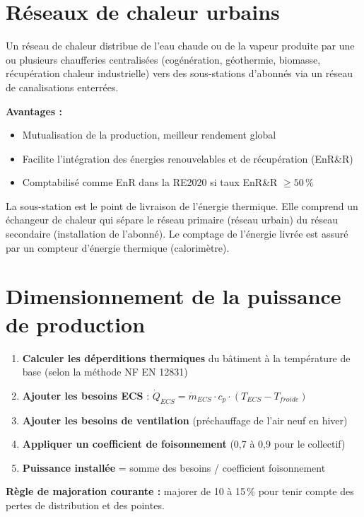 \section{Réseaux de chaleur urbains}

\begin{definition}[title=Réseau de chaleur urbain]
Un réseau de chaleur distribue de l'eau chaude ou de la vapeur produite par une ou plusieurs chaufferies centralisées (cogénération, géothermie, biomasse, récupération chaleur industrielle) vers des sous-stations d'abonnés via un réseau de canalisations enterrées.

\textbf{Avantages :}
\begin{itemize}
  \item Mutualisation de la production, meilleur rendement global
  \item Facilite l'intégration des énergies renouvelables et de récupération (EnR\&R)
  \item Comptabilisé comme EnR dans la RE2020 si taux EnR\&R $\geq 50\,\%$
\end{itemize}
\end{definition}

\begin{definition}[title=Sous-station d'abonné]
La sous-station est le point de livraison de l'énergie thermique. Elle comprend un échangeur de chaleur qui sépare le réseau primaire (réseau urbain) du réseau secondaire (installation de l'abonné). Le comptage de l'énergie livrée est assuré par un compteur d'énergie thermique (calorimètre).
\end{definition}

\section{Dimensionnement de la puissance de production}

\begin{methode}[title=Méthode de calcul de la puissance installée]
\begin{enumerate}
  \item \textbf{Calculer les déperditions thermiques} du bâtiment à la température de base (selon la méthode NF EN 12831)
  \item \textbf{Ajouter les besoins ECS} : $\dot{Q}_{ECS} = \dot{m}_{ECS} \cdot c_p \cdot (T_{ECS} - T_{froide})$
  \item \textbf{Ajouter les besoins de ventilation} (préchauffage de l'air neuf en hiver)
  \item \textbf{Appliquer un coefficient de foisonnement} (0,7 à 0,9 pour le collectif)
  \item \textbf{Puissance installée} = somme des besoins / coefficient foisonnement
\end{enumerate}

\textbf{Règle de majoration courante :} majorer de 10 à 15\,\% pour tenir compte des pertes de distribution et des pointes.
\end{methode}

